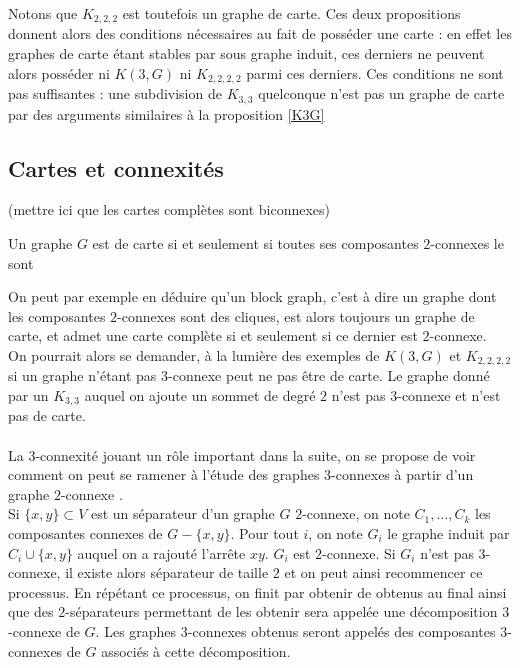 \documentclass{scrartcl}
\begin{document}
\begin{flushleft}
Notons que $K_{2,2,2}$ est toutefois un graphe de carte. Ces deux propositions donnent alors des conditions nécessaires au fait
de posséder une carte : en effet les graphes de carte étant stables par sous graphe induit, ces derniers ne peuvent alors
posséder ni $K(3, G)$ ni $K_{2,2,2,2}$ parmi ces derniers. Ces conditions ne sont pas suffisantes : une subdivision
de $K_{3,3}$ quelconque n'est pas un graphe de carte par des arguments similaires à la proposition \ref{K3G}

\subsection{Cartes et connexités}\label{cartesetconnex}

(mettre ici que les cartes complètes sont biconnexes)

\begin{prop}\label{suffbiconn}
    Un graphe $G$ est de carte si et seulement si toutes ses composantes $2$-connexes le sont
\end{prop}

On peut par exemple en déduire qu'un block graph, c'est à dire un graphe dont les composantes $2$-connexes sont des cliques,
est alors toujours un graphe de carte, et admet une carte complète si et seulement si ce dernier est $2$-connexe.\\
On pourrait alors se demander, à la lumière des exemples de $K(3,G)$ et $K_{2,2,2,2}$ si un graphe n'étant pas $3$-connexe
peut ne pas être de carte. Le graphe donné par un $K_{3,3}$ auquel on ajoute un sommet de degré $2$ n'est pas $3$-connexe
et n'est pas de carte.
\\~\\
La $3$-connexité jouant un rôle important dans la suite, on se propose de voir comment on peut se ramener à l'étude des
graphes $3$-connexes à partir d'un graphe $2$-connexe \cite{3connComp}.\\
Si $\{x,y\} \subset V$ est un séparateur d'un graphe $G$ $2$-connexe, on note $C_1, ..., C_k$ les composantes connexes de
$G - \{x,y\}$. Pour tout $i$, on note $G_i$ le graphe induit par $C_i \cup \{x,y\}$ auquel on a rajouté l'arrête $xy$.
$G_i$ est $2$-connexe. Si $G_i$ n'est pas $3$-connexe, il existe alors séparateur de taille $2$ et on peut ainsi recommencer
ce processus. En répétant ce processus, on finit par obtenir de  obtenus au final ainsi que des $2$-séparateurs permettant de
les obtenir sera appelée une décomposition $3$-connexe de $G$. Les graphes $3$-connexes obtenus seront appelés des composantes
$3$-connexes de $G$ associés à cette décomposition.


\end{flushleft}
\end{document}
